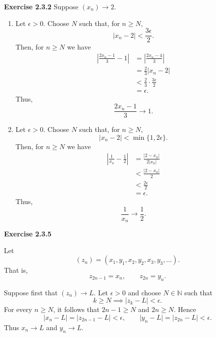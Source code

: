 \documentclass[12pt]{article}
\begin{document}
\textbf{Exercise 2.3.2}
Suppose \( (x_n) \to 2 \).
\begin{enumerate}[label=(\alph*)]
    \item Let \( \epsilon > 0 \). Choose \( N \) such that, for \( n \geq N \),
          \[
              |x_n - 2| < \frac{3\epsilon }{2}.
          \]
          Then, for \( n \geq N \) we have
          \[
              \begin{split}
                  \left\vert \frac{2x_n - 1}{3} - 1 \right\vert & = \left\vert \frac{2x_n - 4}{3} \right\vert \\
                                                                & = \frac{2}{3} \vert x_n - 2 \vert           \\
                                                                & < \frac{2}{3} \cdot \frac{3\epsilon }{2}    \\
                                                                & = \epsilon .
              \end{split}
          \]
          Thus,
          \[
              \frac{2x_n - 1}{3} \to  1.
          \]

    \item Let \( \epsilon > 0 \). Choose \(  N \) such that, for \(  n \geq N \),
          \[
              \vert x_n - 2 \vert < \min\{1, 2\epsilon \}.
          \]
          Then, for \( n \geq N \) we have
          \[
              \begin{split}
                  \left\vert \frac{1}{x_n} - \frac{1}{2} \right\vert & = \frac{\vert 2 - x_n \vert }{2\vert x_n \vert } \\
                                                                     & < \frac{\vert 2 - x_n \vert }{2}                 \\
                                                                     & < \frac{2\epsilon }{2}                           \\
                                                                     & = \epsilon.
              \end{split}
          \]
          Thus,
          \[
              \frac{1}{x_n} \to \frac{1}{2}.
          \]
\end{enumerate}

\textbf{Exercise 2.3.5}

Let
\[
    (z_n) = (x_1, y_1, x_2, y_2, x_3, y_3, \dots ).
\]
That is,
\[
    z_{2n-1} = x_n, \qquad z_{2n} = y_n.
\]


Suppose first that \( (z_n) \to L\). Let \( \epsilon > 0 \) and choose \( N \in \mathbb{N} \) such that
\[
    k \geq N \implies |z_k - L| < \epsilon .
\]
For every \( n \geq N \), it follows that \( 2n - 1 \geq N \) and \( 2n \geq N \).
Hence
\[
    |x_n - L| =  \vert z_{2n-1} - L \vert < \epsilon , \qquad \vert y_n - L \vert = \vert z_{2n} - L \vert < \epsilon .
\]
Thus \( x_n \to L \) and \( y_n \to  L \).
\end{document}
